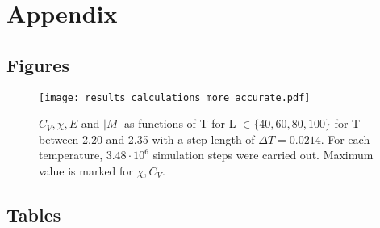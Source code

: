 \documentclass[10pt,a4paper]{article}
\begin{document}
\section{Appendix}
\subsection{Figures}
\begin{figure}[H]
\texttt{[image: results\_calculations\_more\_accurate.pdf]}
\caption[$C_V,\chi,E, |M|$ for T between 2.20 and 2.35]{$C_V,\chi,E$ and $|M|$ as functions of T for  L $ \in \{40,60,80,100\}$ for T between 2.20 and 2.35 with a step length of $\Delta T=0.0214$. For each temperature, $3.48\cdot10^6$ simulation steps were carried out. Maximum value is marked for $\chi,C_V$.}\label{for T between 2.20 and 2.35}
\end{figure}

\subsection{Tables}
\end{document}
